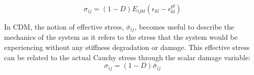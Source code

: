 \begin{equation}
\sigma_{ij}=\left(1-D\right)E_{ijkl}\left(\epsilon_{kl}-\epsilon^{pl}_{kl}\right)
\label{eqn:const5}
\end{equation}

In CDM, the notion of effective stress, $\bar{\sigma}_{ij}$, becomes useful to describe the mechanics of the system as it refers to the stress that the system would be experiencing without any stiffness degradation or damage. This effective stress can be related to the actual Cauchy stress through the scalar damage variable: 
\begin{equation}
\sigma_{ij}=\left(1-D\right)\bar{\sigma}_{ij}
\label{eqn:const7}
\end{equation}